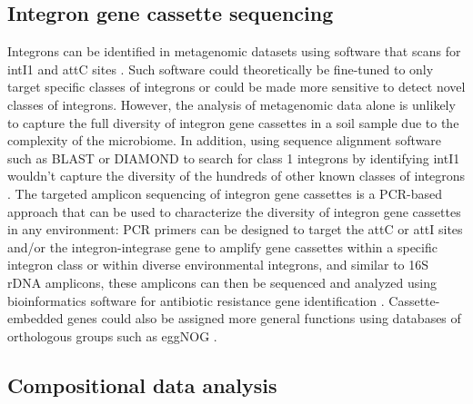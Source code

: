 \subsection{Integron gene cassette sequencing}

Integrons can be identified in metagenomic datasets using software that scans for intI1 and attC sites \parencite{Cury.2016}.
Such software could theoretically be fine-tuned to only target specific classes of integrons or could be made more sensitive to detect novel classes of integrons.
However, the analysis of metagenomic data alone is unlikely to capture the full diversity of integron gene cassettes in a soil sample due to the complexity of the microbiome.
In addition, using sequence alignment software such as BLAST or DIAMOND to search for class 1 integrons by identifying intI1 wouldn’t capture the diversity of the hundreds of other known classes of integrons \parencite{Altschul.1990, Buchfink.2015}.
The targeted amplicon sequencing of integron gene cassettes is a PCR-based approach that can be used to characterize the diversity of integron gene cassettes in any environment:
PCR primers can be designed to target the attC or attI sites and/or the integron-integrase gene to amplify gene cassettes within a specific integron class or within diverse environmental integrons, and similar to 16S rDNA amplicons, these amplicons can then be sequenced and analyzed using bioinformatics software for antibiotic resistance gene identification \parencite{Yang.2021, Ghaly.2019}.
Cassette-embedded genes could also be assigned more general functions using databases of orthologous groups such as eggNOG \parencite{HuertaCepas.2019}.

\subsection{Compositional data analysis}

